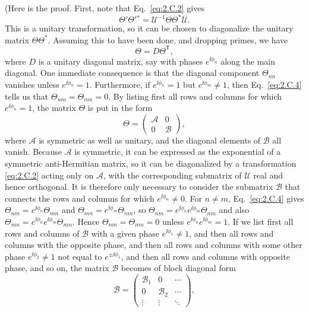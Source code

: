 (Here is the proof. First, note that Eq.~\eqref{eq:2.C.2} gives
\begin{equation*}
  \Theta'\Theta'{}^*
    =\mathcal{U}^{-1}\Theta\Theta^*\mathcal{U}.
\end{equation*}
This is a unitary transformation, so it can be chosen to diagonalize the
unitary matrix $\Theta\Theta^*$. Assuming this to have been done,
and dropping primes, we have
\begin{equation}
  \Theta=D\Theta^{\mathsf T},
  \tag{2.C.4}\label{eq:2.C.4}
\end{equation}
where $D$ is a unitary diagonal matrix, say with phases $e^{\ii\phi_n}$ along
the main diagonal. One immediate consequence is that the diagonal component
$\Theta_{nn}$ vanishes unless $e^{\ii\phi_n}=1$. Furthermore, if
$e^{\ii\phi_n}=1$ but $e^{\ii\phi_m}\neq1$, then Eq.~\eqref{eq:2.C.4} tells us that
$\Theta_{nm}=\Theta_{mn}=0$. By listing first all rows and columns
for which $e^{\ii\phi_n}=1$, the matrix $\Theta$ is put in the form
\begin{equation}
  \Theta=
  \begin{pmatrix}
    \mathcal{A} & 0 \\
    0 & \mathcal{B}
  \end{pmatrix},
  \tag{2.C.5}\label{eq:2.C.5}
\end{equation}
where $\mathcal{A}$ is symmetric as well as unitary, and the diagonal
elements of $\mathcal{B}$ all vanish. Because $\mathcal{A}$ is symmetric, it
can be expressed as the exponential of a symmetric anti-Hermitian matrix, so
it can be diagonalized by a transformation \eqref{eq:2.C.2} acting only on
$\mathcal{A}$, with the corresponding submatrix of $\mathcal{U}$ real and
hence orthogonal. It is therefore only necessary to consider the submatrix
$\mathcal{B}$ that connects the rows and columns for which
$e^{\ii\phi_n}\neq0$. For $n\neq m$, Eq.~\eqref{eq:2.C.4} gives
$\Theta_{nm}=e^{\ii\phi_n}\Theta_{mn}$ and
$\Theta_{mn}=e^{\ii\phi_m}\Theta_{nm}$, so
$\Theta_{nm}=e^{\ii\phi_n}e^{\ii\phi_m}\Theta_{nm}$ and also
$\Theta_{mn}=e^{\ii\phi_n}e^{\ii\phi_m}\Theta_{mn}$. Hence
$\Theta_{nm}=\Theta_{mn}=0$ unless
$e^{\ii\phi_n}e^{\ii\phi_m}=1$. If we list first all rows and columns of
$\mathcal{B}$ with a given phase $e^{\ii\phi_1}\neq1$, and then all rows and
columns with the opposite phase, and then all rows and columns with some
other phase $e^{\ii\phi_2}\neq1$ not equal to $e^{\pm \ii\phi_1}$, and then all
rows and columns with opposite phase, and so on, the matrix $\mathcal{B}$
becomes of block diagonal form
\begin{equation}
  \mathcal{B}=
  \begin{pmatrix}
    \mathcal{B}_1 & 0 & \cdots \\
    0 & \mathcal{B}_2 & \cdots \\
    \vdots & \vdots & \ddots
  \end{pmatrix},
  \tag{2.C.6}\label{eq:2.C.6}
\end{equation}

